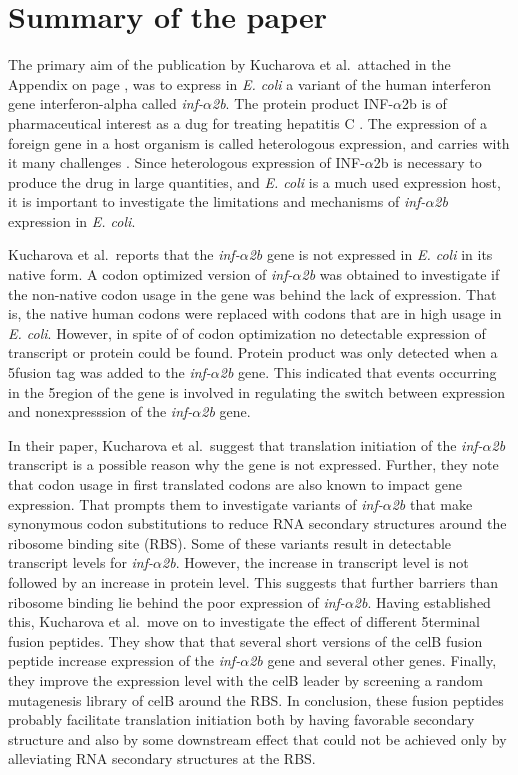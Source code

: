 %
\section{Summary of the paper}
The primary aim of the publication by Kucharova et al.\, attached in the
Appendix on page \pageref{vero_paper}, was to express in \textit{E. coli} a
variant of the human interferon gene interferon-alpha called
\textit{inf-$\alpha$2b}. The protein product INF-$\alpha$2b is of
pharmaceutical interest as a dug for treating hepatitis C
\cite{manns_peginterferon_2001}. The expression of a foreign gene in a host
organism is called heterologous expression, and carries with it many challenges
\cite{gustafsson_codon_2004}. Since heterologous expression of INF-$\alpha$2b
is necessary to produce the drug in large quantities, and \textit{E. coli} is a
much used expression host, it is important to investigate the limitations and
mechanisms of \textit{inf-$\alpha$2b} expression in \textit{E. coli}.

Kucharova et al.\ reports that the \textit{inf-$\alpha$2b} gene is not
expressed in \textit{E. coli} in its native form. A codon optimized version of
\textit{inf-$\alpha$2b} was obtained to investigate if the non-native codon
usage in the gene was behind the lack of expression. That is, the native human
codons were replaced with codons that are in high usage in \textit{E. coli}.
However, in spite of of codon optimization no detectable expression of
transcript or protein could be found. Protein product was only detected when a
5\ppp fusion tag was added to the \textit{inf-$\alpha$2b} gene. This indicated
that events occurring in the 5\ppp region of the gene is involved in regulating
the switch between expression and nonexpresssion of the \textit{inf-$\alpha$2b}
gene.

In their paper, Kucharova et al.\ suggest that translation initiation of the
\textit{inf-$\alpha$2b} transcript is a possible reason why the gene is not
expressed. Further, they note that codon usage in first translated codons are
also known to impact gene expression. That prompts them to investigate variants
of \textit{inf-$\alpha$2b} that make synonymous codon substitutions to reduce
RNA secondary structures around the ribosome binding site (RBS). Some of these
variants result in detectable transcript levels for \textit{inf-$\alpha$2b}.
However, the increase in transcript level is not followed by an increase in
protein level. This suggests that further barriers than ribosome binding lie
behind the poor expression of \textit{inf-$\alpha$2b}. Having established this,
Kucharova et al.\ move on to investigate the effect of different 5\ppp terminal
fusion peptides. They show that that several short versions of the celB fusion
peptide increase expression of the \textit{inf-$\alpha$2b} gene and several
other genes. Finally, they improve the expression level with the celB leader by
screening a random mutagenesis library of celB around the RBS. In conclusion,
these fusion peptides probably facilitate translation initiation both by having
favorable secondary structure and also by some downstream effect that could not
be achieved only by alleviating RNA secondary structures at the RBS.

